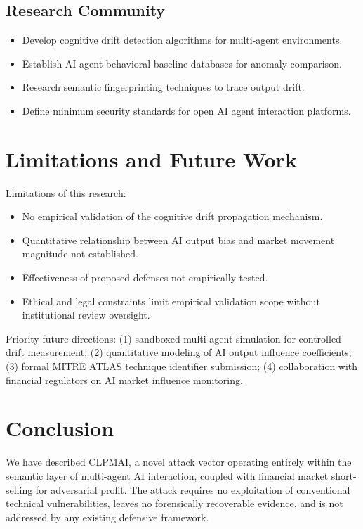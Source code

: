 \documentclass[11pt,a4paper]{article}
\begin{document}
\subsection{Research Community}
\begin{itemize}[leftmargin=2em]
  \item Develop cognitive drift detection algorithms for multi-agent environments.
  \item Establish AI agent behavioral baseline databases for anomaly comparison.
  \item Research semantic fingerprinting techniques to trace output drift.
  \item Define minimum security standards for open AI agent interaction platforms.
\end{itemize}

\section{Limitations and Future Work}

Limitations of this research:

\begin{itemize}[leftmargin=2em]
  \item No empirical validation of the cognitive drift propagation mechanism.
  \item Quantitative relationship between AI output bias and market movement
        magnitude not established.
  \item Effectiveness of proposed defenses not empirically tested.
  \item Ethical and legal constraints limit empirical validation scope
        without institutional review oversight.
\end{itemize}

Priority future directions:
(1) sandboxed multi-agent simulation for controlled drift measurement;
(2) quantitative modeling of AI output influence coefficients;
(3) formal MITRE ATLAS technique identifier submission;
(4) collaboration with financial regulators on AI market influence monitoring.

\section{Conclusion}

We have described CLPMAI, a novel attack vector operating entirely within
the semantic layer of multi-agent AI interaction, coupled with financial
market short-selling for adversarial profit. The attack requires no
exploitation of conventional technical vulnerabilities, leaves no
forensically recoverable evidence, and is not addressed by any existing
defensive framework.
\end{document}
